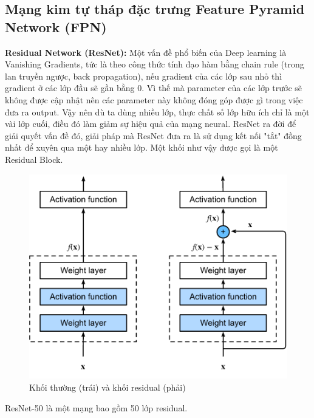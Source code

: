 \documentclass[a4paper, 12pt]{report}
\begin{document}
\subsection{Mạng kim tự tháp đặc trưng Feature Pyramid Network (FPN)}

\textbf{Residual Network (ResNet):} Một vấn đề phổ biến của Deep learning là Vanishing Gradients, tức là theo công thức tính đạo hàm bằng chain rule (trong lan truyền ngược, back propagation), nếu gradient của các lớp sau nhỏ thì gradient ở các lớp đầu sẽ gần bằng 0. Vì thế mà parameter của các lớp trước sẽ không được cập nhật nên các parameter này không đóng góp được gì trong việc đưa ra output. Vậy nên dù ta dùng nhiều lớp, thực chất số lớp hữu ích chỉ là một vài lớp cuối, điều đó làm giảm sự hiệu quả của mạng neural. ResNet ra đời để giải quyết vấn đề đó, giải pháp mà ResNet đưa ra là sử dụng kết nối "tắt" đồng nhất để xuyên qua một hay nhiều lớp. Một khối như vậy được gọi là một Residual Block.\par
\begin{figure}[!h]
	\centering
	\includegraphics[width=0.5\linewidth]{Images/resnet_1}
	\caption{Khối thường (trái) và khối residual (phải)}
	\label{fig:resnet-1}
\end{figure}
ResNet-50 là một mạng bao gồm 50 lớp residual.\par
\end{document}
